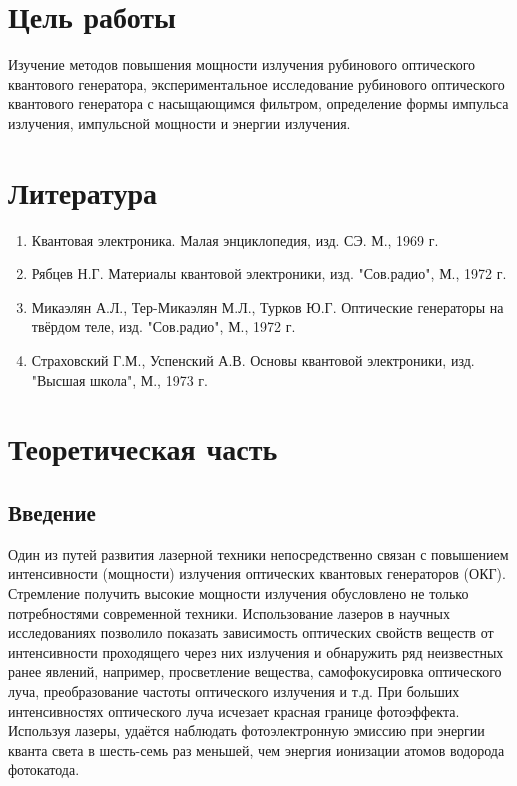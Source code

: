 \documentclass[a4paper,14pt,russian]{article}
\begin{document}
\section {Цель работы}
Изучение методов повышения мощности излучения рубинового оптического квантового генератора, экспериментальное исследование рубинового оптического квантового генератора с насыщающимся фильтром, определение формы импульса излучения, импульсной мощности и энергии излучения.

\section {Литература}

\begin{enumerate}
\item  Квантовая электроника. Малая энциклопедия, изд. СЭ. М., 1969 г.
\item Рябцев Н.Г. Материалы квантовой электроники, изд. "Сов.радио", М., 1972 г.
\item Микаэлян А.Л., Тер-Микаэлян М.Л., Турков Ю.Г. Оптические генераторы на твёрдом теле, изд. "Сов.радио", М., 1972 г.
\item Страховский Г.М., Успенский А.В. Основы квантовой электроники, изд. "Высшая школа", М., 1973 г.
\end{enumerate}

\section {Теоретическая часть}

\subsection {Введение}

Один из путей развития лазерной техники непосредственно связан с повышением интенсивности (мощности) излучения оптических квантовых генераторов (ОКГ). Стремление получить высокие мощности излучения обусловлено не только потребностями современной техники. Использование лазеров в научных исследованиях позволило показать зависимость оптических свойств веществ от интенсивности проходящего через них излучения и обнаружить ряд неизвестных ранее явлений, например, просветление вещества, самофокусировка оптического луча, преобразование частоты оптического излучения и т.д. При больших интенсивностях оптического луча исчезает красная границе фотоэффекта. Используя лазеры, удаётся наблюдать фотоэлектронную эмиссию при энергии кванта света в шесть-семь раз меньшей, чем энергия ионизации атомов водорода фотокатода.
\end{document}
